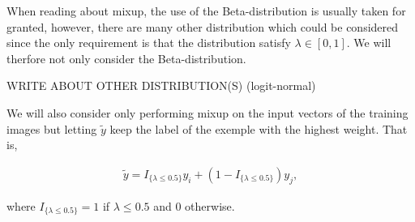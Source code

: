\documentclass{article}
\begin{document}
When reading about mixup, the use of the Beta-distribution is usually taken for granted, however, there are many other distribution which 
could be considered since the only requirement is that the distribution satisfy $\lambda \in [0,1]$. We will therfore not only consider the 
Beta-distribution. 

WRITE ABOUT OTHER DISTRIBUTION(S) (logit-normal)

We will also consider only performing mixup on the input vectors of the training images but letting $\tilde{y}$ keep the label of the exemple 
with the highest weight. That is,

\begin{align*}
\tilde{y} = I_{\{ \lambda \leq 0.5 \}} y_i + (1-I_{\{ \lambda \leq 0.5 \}}) y_j, 
\end{align*}

where $I_{\{ \lambda \leq 0.5 \}} = 1$ if $\lambda \leq 0.5$ and $0$ otherwise.
\end{document}

